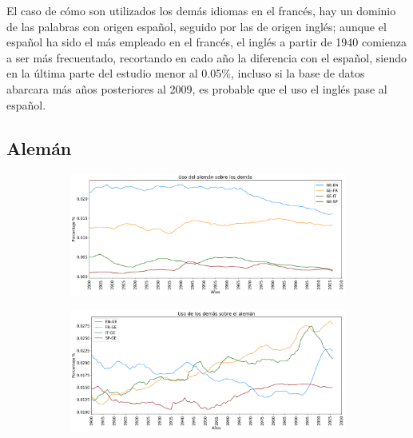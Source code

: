El caso de cómo son utilizados los demás idiomas en el francés,  hay un dominio de las palabras con origen español, seguido por las de origen inglés; aunque el español ha sido el más empleado en el francés,  el inglés a partir de 1940 comienza a ser más frecuentado,  recortando en cado año la diferencia con el español,  siendo en la última parte del estudio  menor al 0.05$\%$, incluso si la base de datos abarcara más años posteriores al 2009, es probable que el uso el inglés pase al español. 


\newpage
\subsection{Alemán}

\begin{figure}[h!]
	
	\begin{subfigure}{}
		\centering
		\includegraphics[scale=.38]{Cap_3/PF1_S2_GE.png}
		\caption{}
		\label{fig:ST_GE_a}
	\end{subfigure}
	
	\begin{subfigure}{}
		\centering
		\includegraphics[scale=.38]{Cap_3/PF2_S2_GE.png}
		\caption{}
		\label{fig:ST_GE_b}
	\end{subfigure}
	
\end{figure}

